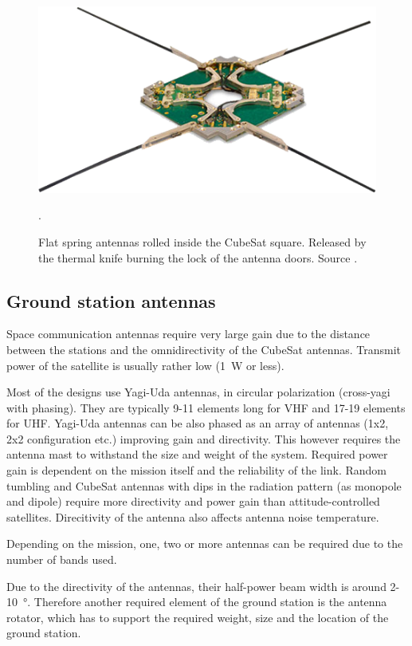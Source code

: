 \begin{figure}
    \centering
    \includegraphics[width=0.5\paperwidth]{img/2/isis_dipole.png}
    \caption{Flat spring antennas rolled inside the CubeSat square. Released by the thermal knife burning the lock of the antenna doors. Source \cite{isis_dipole_antenna}.}.
    \label{isis_dipole_antenna}
\end{figure}

\subsection{Ground station antennas}
Space communication antennas require very large gain due to the distance between the stations and the omnidirectivity of the CubeSat antennas. Transmit power of the satellite is usually rather low (\SI{1}{\watt} or less).

Most of the designs use Yagi-Uda antennas, in circular polarization (cross-yagi with phasing). They are typically 9-11 elements long for VHF and 17-19 elements for UHF. Yagi-Uda antennas can be also phased as an array of antennas (1x2, 2x2 configuration etc.) improving gain and directivity. This however requires the antenna mast to withstand the size and weight of the system. Required power gain is dependent on the mission itself and the reliability of the link. Random tumbling and CubeSat antennas with dips in the radiation pattern (as monopole and dipole) require more directivity and power gain than attitude-controlled satellites. Direcitivity of the antenna also affects antenna noise temperature.

Depending on the mission, one, two or more antennas can be required due to the number of bands used. 

Due to the directivity of the antennas, their half-power beam width is around \si{2}-\SI{10}{\degree}. Therefore another required element of the ground station is the antenna rotator, which has to support the required weight, size and the location of the ground station.

